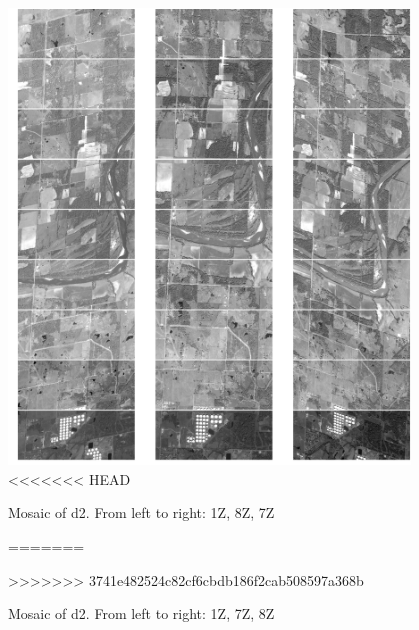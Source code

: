 \documentclass[paper=a4, fontsize=11pt, onecolumn, tikz, dvipsnames, svgnames, x11names]{article}
\begin{document}
\newpage
\begin{figure}
    \centering
    \includegraphics[width = 0.95\textwidth]{d2.png}
<<<<<<< HEAD
    \caption{Mosaic of d2. From left to right: 1Z, 8Z, 7Z}
    \label{fig_mosaic_d2}
=======
    \caption{Mosaic of d2. From left to right: 1Z, 7Z, 8Z}
    \label{}
>>>>>>> 3741e482524c82cf6cbdb186f2cab508597a368b
\end{figure}
\end{document}
